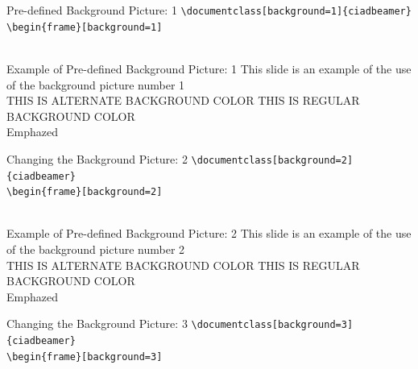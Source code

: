 \documentclass[english,sectioncirclenumberstyle]{ciadbeamer}
\begin{document}
\begin{frame}[t]{{Pre-defined Background Picture:} 1}
	\texttt{{\textbackslash}documentclass[background=1]\{ciadbeamer\}} \\[.25cm]
	\texttt{{\textbackslash}begin\{frame\}[background=1]} \\[.25cm]
	\centering{} \\[.25cm]
\end{frame}

\begin{frame}[background=1]{Example of Pre-defined Background Picture: 1}
	This slide is an example of the use of the background picture number 1 \\[.5cm]
	\ifbeamerthemeciadalternatebgcolor%
		THIS IS ALTERNATE BACKGROUND COLOR%
	\else%
		THIS IS REGULAR BACKGROUND COLOR%
	\fi\\[.5cm]%
	Emphazed 
\end{frame}

\begin{frame}[t]{{Changing the Background Picture:} 2}
	\texttt{{\textbackslash}documentclass[background=2]\{ciadbeamer\}} \\[.25cm]
	\texttt{{\textbackslash}begin\{frame\}[background=2]} \\[.25cm]
	\centering{} \\[.25cm]
\end{frame}

\begin{frame}[background=2]{Example of Pre-defined Background Picture: 2}
	This slide is an example of the use of the background picture number 2 \\[.5cm]
	\ifbeamerthemeciadalternatebgcolor%
		THIS IS ALTERNATE BACKGROUND COLOR%
	\else%
		THIS IS REGULAR BACKGROUND COLOR%
	\fi\\[.5cm]%
	Emphazed 
\end{frame}

\begin{frame}[t]{{Changing the Background Picture:} 3}
	\texttt{{\textbackslash}documentclass[background=3]\{ciadbeamer\}} \\[.25cm]
	\texttt{{\textbackslash}begin\{frame\}[background=3]} \\[.25cm]
	\centering{} \\[.25cm]
\end{frame}
\end{document}
